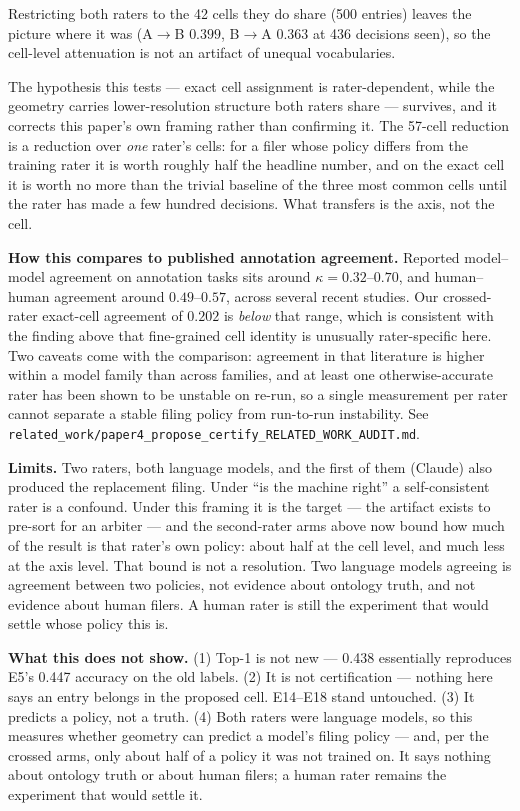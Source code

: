 \documentclass[11pt]{article}
\begin{document}
Restricting both raters to the 42 cells they do share (500 entries) leaves the
picture where it was (A$\to$B $0.399$, B$\to$A $0.363$ at 436 decisions seen),
so the cell-level attenuation is not an artifact of unequal vocabularies.

The hypothesis this tests --- exact cell assignment is rater-dependent, while
the geometry carries lower-resolution structure both raters share --- survives,
and it corrects this paper's own framing rather than confirming it. The 57-cell
reduction is a reduction over \emph{one} rater's cells: for a filer whose
policy differs from the training rater it is worth roughly half the headline
number, and on the exact cell it is worth no more than the trivial baseline of
the three most common cells until the rater has made a few hundred decisions.
What transfers is the axis, not the cell.

\textbf{How this compares to published annotation agreement.} Reported
model--model agreement on annotation tasks sits around $\kappa = 0.32$--$0.70$,
and human--human agreement around $0.49$--$0.57$, across several recent
studies. Our crossed-rater exact-cell agreement of $0.202$ is \emph{below} that
range, which is consistent with the finding above that fine-grained cell
identity is unusually rater-specific here. Two caveats come with the
comparison: agreement in that literature is higher within a model family than
across families, and at least one otherwise-accurate rater has been shown to be
unstable on re-run, so a single measurement per rater cannot separate a stable
filing policy from run-to-run instability. See
\texttt{related\_work/paper4\_propose\_certify\_RELATED\_WORK\_AUDIT.md}.

\textbf{Limits.} Two raters, both language models, and the first of them
(Claude) also produced the replacement filing. Under ``is the machine right''
a self-consistent rater is a confound. Under this framing it is the target ---
the artifact exists to pre-sort for an arbiter --- and the second-rater arms
above now bound how much of the result is that rater's own policy: about half
at the cell level, and much less at the axis level. That bound is not a
resolution. Two language models agreeing is agreement between two policies,
not evidence about ontology truth, and not evidence about human filers. A
human rater is still the experiment that would settle whose policy this is.

\textbf{What this does not show.} (1) Top-1 is not new --- 0.438
essentially reproduces E5's 0.447 accuracy on the old labels. (2) It is
not certification --- nothing here says an entry belongs in the proposed
cell. E14--E18 stand untouched. (3) It predicts a policy, not a truth. (4)
Both raters were language models, so this measures whether geometry can
predict a model's filing policy --- and, per the crossed arms, only about half
of a policy it was not trained on. It says nothing about ontology truth or
about human filers; a human rater remains the experiment that would settle it.
\end{document}
